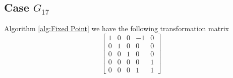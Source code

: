 \documentclass{article}
\theoremstyle{plain}
\theoremstyle{definition}
\newcommand{\tand}{\ensuremath{\,\,\, \text{and} \,\,\,}}
\begin{document}
\subsection{Case $G_{17}$}
Algorithm \ref{alg:Fixed Point} we have the following transformation matrix 
$$
 \left[ \begin {array}{ccccc} 1&0&0&-1&0\\ 0&1&0&0&0
\\ 0&0&1&0&0\\ 0&0&0&0&1
\\ 0&0&0&1&1\end {array} \right] 
$$
\end{document}
